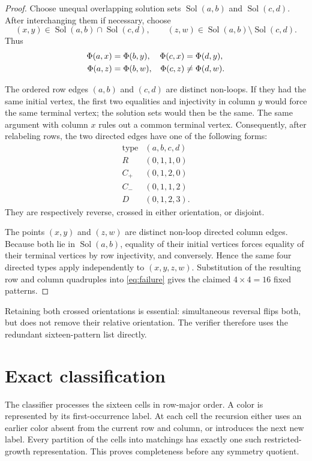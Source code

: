 \documentclass[11pt]{article}
\newcommand{\Sol}{\operatorname{Sol}}
\begin{document}
\begin{proof}
Choose unequal overlapping solution sets $\Sol(a,b)$ and $\Sol(c,d)$.  After
interchanging them if necessary, choose
\[
 (x,y)\in\Sol(a,b)\cap\Sol(c,d),\qquad
 (z,w)\in\Sol(a,b)\setminus\Sol(c,d).
\]
Thus
\begin{align}\label{eq:failure}
 \Phi(a,x)&=\Phi(b,y), & \Phi(c,x)&=\Phi(d,y),\notag\\
 \Phi(a,z)&=\Phi(b,w), & \Phi(c,z)&\ne\Phi(d,w).
\end{align}

The ordered row edges $(a,b)$ and $(c,d)$ are distinct non-loops.  If they had
the same initial vertex, the first two equalities and injectivity in column
$y$ would force the same terminal vertex; the solution sets would then be the
same.  The same argument with column $x$ rules out a common terminal vertex.
Consequently, after relabeling rows, the two directed edges have one of the
following forms:
\[
 \begin{array}{c|c}
 \text{type}&(a,b,c,d)\\ \hline
 R&(0,1,1,0)\\
 C_+&(0,1,2,0)\\
 C_-&(0,1,1,2)\\
 D&(0,1,2,3).
 \end{array}
\]
They are respectively reverse, crossed in either orientation, or disjoint.

The points $(x,y)$ and $(z,w)$ are distinct non-loop directed column edges.
Because both lie in $\Sol(a,b)$, equality of their initial vertices forces
equality of their terminal vertices by row injectivity, and conversely.
Hence the same four directed types apply independently to $(x,y,z,w)$.
Substitution of the resulting row and column quadruples into
\eqref{eq:failure} gives the claimed $4\times4=16$ fixed patterns.
\end{proof}

Retaining both crossed orientations is essential: simultaneous reversal flips
both, but does not remove their relative orientation.  The verifier therefore
uses the redundant sixteen-pattern list directly.

\section{Exact classification}

The classifier processes the sixteen cells in row-major order.  A color is
represented by its first-occurrence label.  At each cell the recursion either
uses an earlier color absent from the current row and column, or introduces
the next new label.  Every partition of the cells into matchings has exactly
one such restricted-growth representation.  This proves completeness before
any symmetry quotient.
\end{document}
